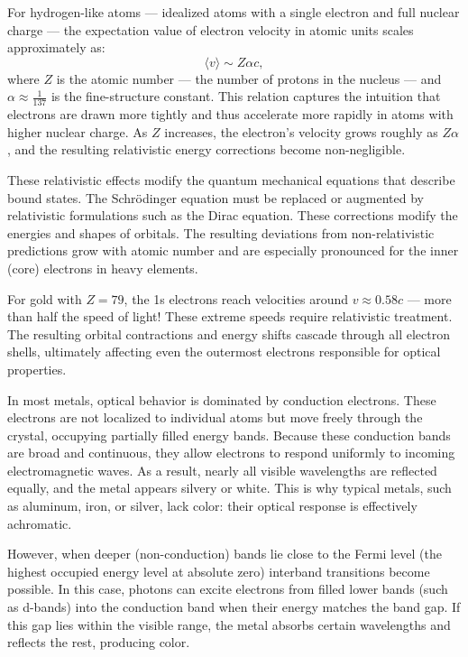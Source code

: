 For hydrogen-like atoms — idealized atoms with a single electron and full nuclear charge — the expectation value of electron velocity in atomic units scales approximately as:
\[
\langle v \rangle \sim Z\alpha c,
\]
where \( Z \) is the atomic number — the number of protons in the nucleus — and \( \alpha \approx \tfrac{1}{137} \) is the fine-structure constant. This relation captures the intuition that electrons are drawn more tightly and thus accelerate more rapidly in atoms with higher nuclear charge. As \( Z \) increases, the electron’s velocity grows roughly as \( Z\alpha \), and the resulting relativistic energy corrections become non-negligible.

These relativistic effects modify the quantum mechanical equations that describe bound states. The Schrödinger equation must be replaced or augmented by relativistic formulations such as the Dirac equation. These corrections modify the energies and shapes of orbitals. The resulting deviations from non-relativistic predictions grow with atomic number and are especially pronounced for the inner (core) electrons in heavy elements.

For gold with $Z = 79$, the 1s electrons reach velocities around $v \approx 0.58c$ — more than half the speed of light! These extreme speeds require relativistic treatment. The resulting orbital contractions and energy shifts cascade through all electron shells, ultimately affecting even the outermost electrons responsible for optical properties.

In most metals, optical behavior is dominated by conduction electrons. These electrons are not localized to individual atoms but move freely through the crystal, occupying partially filled energy bands. Because these conduction bands are broad and continuous, they allow electrons to respond uniformly to incoming electromagnetic waves. As a result, nearly all visible wavelengths are reflected equally, and the metal appears silvery or white. This is why typical metals, such as aluminum, iron, or silver, lack color: their optical response is effectively achromatic.

However, when deeper (non-conduction) bands lie close to the Fermi level (the highest occupied energy level at absolute zero) interband transitions become possible. In this case, photons can excite electrons from filled lower bands (such as d-bands) into the conduction band when their energy matches the band gap. If this gap lies within the visible range, the metal absorbs certain wavelengths and reflects the rest, producing color.


